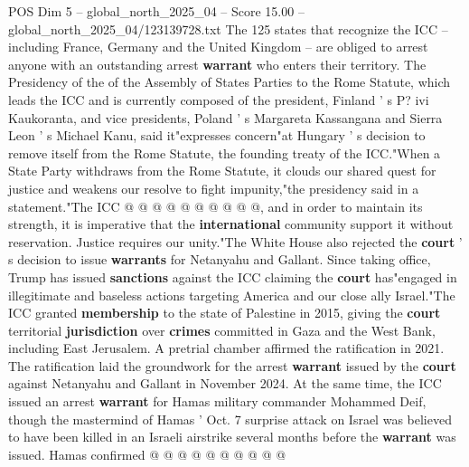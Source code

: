 \begin{textsample}{POS Dim 5 – global\_north\_2025\_04 – Score 15.00 – global\_north\_2025\_04/123139728.txt}
The 125 states that recognize the ICC -- including France, Germany and the United Kingdom -- are obliged to arrest anyone with an outstanding arrest \textbf{warrant} who enters their territory.
The Presidency of the of the Assembly of States Parties to the Rome Statute, which leads the ICC and is currently composed of the president, Finland ' s P? ivi Kaukoranta, and vice presidents, Poland ' s Margareta Kassangana and Sierra Leon ' s Michael Kanu, said it"expresses concern"at Hungary ' s decision to remove itself from the Rome Statute, the founding treaty of the ICC."When a State Party withdraws from the Rome Statute, it clouds our shared quest for justice and weakens our resolve to fight impunity,"the presidency said in a statement."The ICC @ @ @ @ @ @ @ @ @ @, and in order to maintain its strength, it is imperative that the \textbf{international} community support it without reservation.
Justice requires our unity."The White House also rejected the \textbf{court} ' s decision to issue \textbf{warrants} for Netanyahu and Gallant.
Since taking office, Trump has issued \textbf{sanctions} against the ICC claiming the \textbf{court} has"engaged in illegitimate and baseless actions targeting America and our close ally Israel."The ICC granted \textbf{membership} to the state of Palestine in 2015, giving the \textbf{court} territorial \textbf{jurisdiction} over \textbf{crimes} committed in Gaza and the West Bank, including East Jerusalem.
A pretrial chamber affirmed the ratification in 2021.
The ratification laid the groundwork for the arrest \textbf{warrant} issued by the \textbf{court} against Netanyahu and Gallant in November 2024.
At the same time, the ICC issued an arrest \textbf{warrant} for Hamas military commander Mohammed Deif, though the mastermind of Hamas ' Oct. 7 surprise attack on Israel was believed to have been killed in an Israeli airstrike several months before the \textbf{warrant} was issued.
Hamas confirmed @ @ @ @ @ @ @ @ @ @

\end{textsample}
